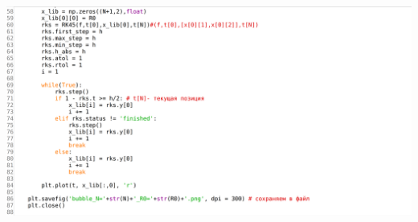 \documentclass[a4paper,14pt]{article}
\begin{document}
\includegraphics[scale=0.16]{images/code/bubble 3.png}\newline

\end{document}
